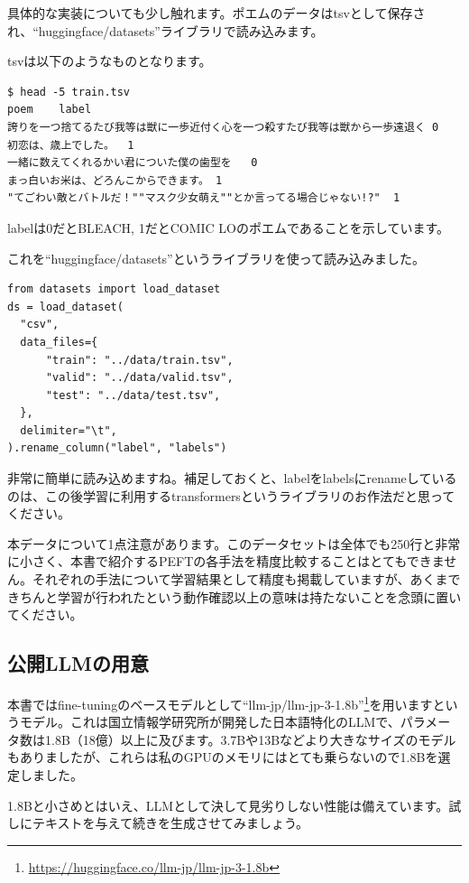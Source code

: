 \documentclass[a5paper,twoside,dvipdfmx]{jsarticle}
\begin{document}
具体的な実装についても少し触れます。ポエムのデータはtsvとして保存され、``huggingface/datasets''ライブラリで読み込みます。

tsvは以下のようなものとなります。

\begin{lstlisting}
$ head -5 train.tsv
poem	label
誇りを一つ捨てるたび我等は獣に一歩近付く心を一つ殺すたび我等は獣から一歩遠退く	0
初恋は、歳上でした。	1
一緒に数えてくれるかい君についた僕の歯型を	0
まっ白いお米は、どろんこからできます。	1
"てごわい敵とバトルだ！""マスク少女萌え""とか言ってる場合じゃない!?"	1
\end{lstlisting}

labelは0だとBLEACH, 1だとCOMIC LOのポエムであることを示しています。

これを``huggingface/datasets''というライブラリを使って読み込みました。

\begin{lstlisting}
from datasets import load_dataset
ds = load_dataset(
  "csv",
  data_files={
      "train": "../data/train.tsv",
      "valid": "../data/valid.tsv",
      "test": "../data/test.tsv",
  },
  delimiter="\t",
).rename_column("label", "labels")
\end{lstlisting}

非常に簡単に読み込めますね。補足しておくと、labelをlabelsにrenameしているのは、この後学習に利用するtransformersというライブラリのお作法だと思ってください。

本データについて1点注意があります。このデータセットは全体でも250行と非常に小さく、本書で紹介するPEFTの各手法を精度比較することはとてもできません。それぞれの手法について学習結果として精度も掲載していますが、あくまできちんと学習が行われたという動作確認以上の意味は持たないことを念頭に置いてください。


\subsection{公開LLMの用意}

本書ではfine-tuningのベースモデルとして``llm-jp/llm-jp-3-1.8b''\footnote{\url{https://huggingface.co/llm-jp/llm-jp-3-1.8b}}を用いますというモデル。これは国立情報学研究所が開発した日本語特化のLLMで、パラメータ数は1.8B（18億）以上に及びます。3.7Bや13Bなどより大きなサイズのモデルもありましたが、これらは私のGPUのメモリにはとても乗らないので1.8Bを選定しました。

1.8Bと小さめとはいえ、LLMとして決して見劣りしない性能は備えています。試しにテキストを与えて続きを生成させてみましょう。
\end{document}
